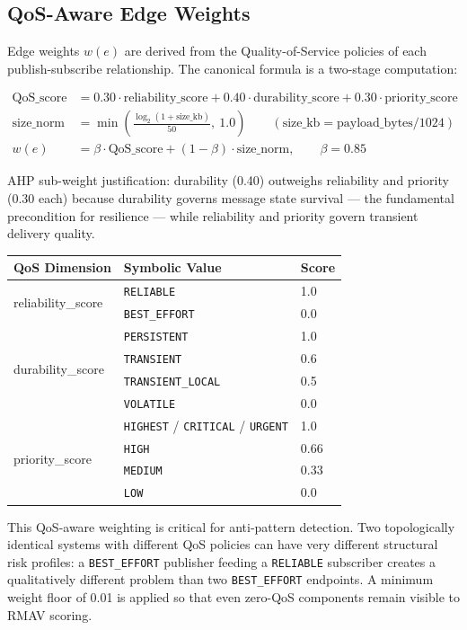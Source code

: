 \documentclass[11pt]{article}
\begin{document}
\subsection{QoS-Aware Edge Weights}

Edge weights $w(e)$ are derived from the Quality-of-Service policies of each publish-subscribe relationship. The canonical formula is a two-stage computation:

\begin{align*}
\text{QoS\_score} &= 0.30 \cdot \text{reliability\_score} + 0.40 \cdot \text{durability\_score} + 0.30 \cdot \text{priority\_score} \\
\text{size\_norm} &= \min\!\left(\frac{\log_2(1 + \text{size\_kb})}{50},\ 1.0\right) \qquad (\text{size\_kb} = \text{payload\_bytes} / 1024) \\
w(e) &= \beta \cdot \text{QoS\_score} + (1 - \beta) \cdot \text{size\_norm}, \qquad \beta = 0.85
\end{align*}

AHP sub-weight justification: durability (0.40) outweighs reliability and priority (0.30 each) because durability governs message state survival --- the fundamental precondition for resilience --- while reliability and priority govern transient delivery quality.

\begin{center}
\begin{tabular}{@{}lll@{}}
\toprule
\textbf{QoS Dimension} & \textbf{Symbolic Value} & \textbf{Score} \\
\midrule
\multirow{2}{*}{reliability\_score} & \texttt{RELIABLE} & 1.0 \\
 & \texttt{BEST\_EFFORT} & 0.0 \\
\multirow{4}{*}{durability\_score} & \texttt{PERSISTENT} & 1.0 \\
 & \texttt{TRANSIENT} & 0.6 \\
 & \texttt{TRANSIENT\_LOCAL} & 0.5 \\
 & \texttt{VOLATILE} & 0.0 \\
\multirow{4}{*}{priority\_score} & \texttt{HIGHEST} / \texttt{CRITICAL} / \texttt{URGENT} & 1.0 \\
 & \texttt{HIGH} & 0.66 \\
 & \texttt{MEDIUM} & 0.33 \\
 & \texttt{LOW} & 0.0 \\
\bottomrule
\end{tabular}
\end{center}

This QoS-aware weighting is critical for anti-pattern detection. Two topologically identical systems with different QoS policies can have very different structural risk profiles: a \texttt{BEST\_EFFORT} publisher feeding a \texttt{RELIABLE} subscriber creates a qualitatively different problem than two \texttt{BEST\_EFFORT} endpoints. A minimum weight floor of 0.01 is applied so that even zero-QoS components remain visible to RMAV scoring.
\end{document}
